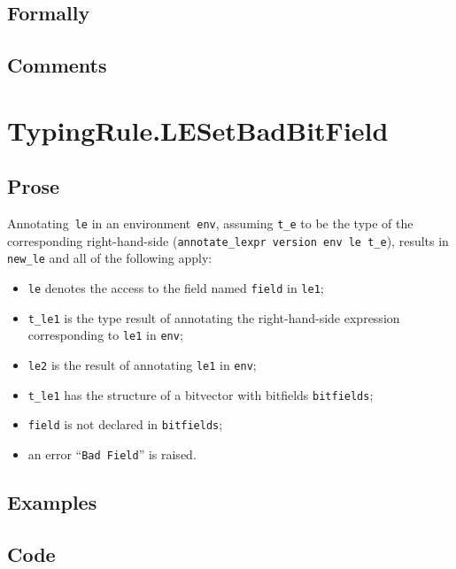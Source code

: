 \documentclass{book}
\begin{document}
  \subsection{Formally}

  \subsection{Comments}

\section{TypingRule.LESetBadBitField \label{sec:TypingRule.LESetBadBitField}}

    \subsection{Prose}
   Annotating~\texttt{le} in an environment~\texttt{env}, assuming
\texttt{t\_e} to be the type of the corresponding right-hand-side
(\texttt{annotate\_lexpr version env le t\_e}), results in \texttt{new\_le} and
all of the following apply:
   \begin{itemize}
   \item \texttt{le} denotes the access to the field named \texttt{field} in \texttt{le1};
   \item \texttt{t\_le1} is the type result of annotating the right-hand-side expression corresponding to \texttt{le1} in \texttt{env};
   \item \texttt{le2} is the result of annotating \texttt{le1} in \texttt{env};
   \item \texttt{t\_le1} has the structure of a bitvector with bitfields \texttt{bitfields};
   \item \texttt{field} is not declared in \texttt{bitfields};
   \item an error ``\texttt{Bad Field}'' is raised.  
   \end{itemize}

  \subsection{Examples}

  \subsection{Code}
\end{document}
